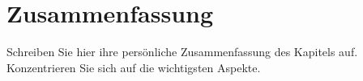 

\section{Zusammenfassung}

Schreiben Sie hier ihre persönliche Zusammenfassung des Kapitels auf. Konzentrieren Sie sich auf die wichtigsten Aspekte.

\vspace*{10cm}



\printbibliography[segment=\therefsegment,heading=subbibliography]

